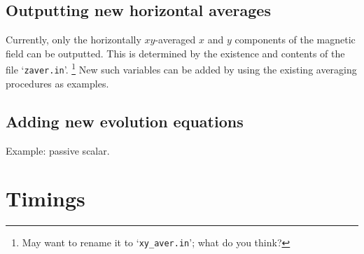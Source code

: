 \documentclass[12pt,twoside,notitlepage,a4paper]{article}
\newcommand{\file}[1]{`\texttt{#1}'}
\begin{document}
\subsection{Outputting new horizontal averages}

Currently, only the horizontally $xy$-averaged $x$ and $y$ components
of the magnetic field can be outputted. This is determined by the existence
and contents of the file \file{zaver.in}.
\footnote{May want to rename it to \file{xy\_aver.in}; what do you think?}
New such variables can be added by using the existing averaging
procedures as examples.


\subsection{Adding new evolution equations}

Example: passive scalar.


\section{Timings}
\end{document}
